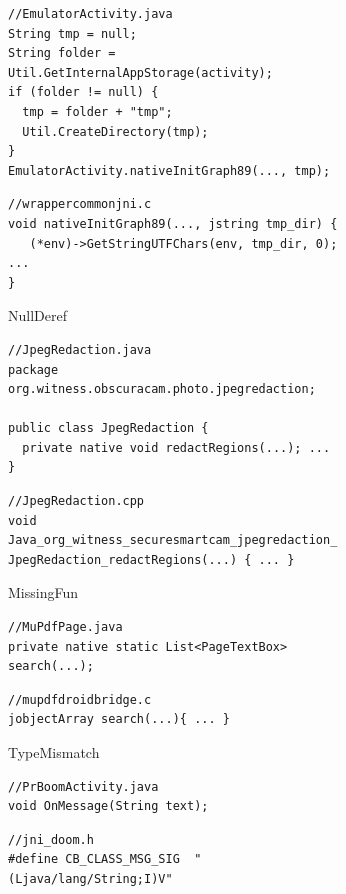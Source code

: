 \begin{figure}[ht!]
  \centering
  \begin{subfigure}{0.8\textwidth}
    \begin{lstlisting}[style=java,xleftmargin=2.5em]
//EmulatorActivity.java
String tmp = null;
String folder = Util.GetInternalAppStorage(activity);
if (folder != null) {
  tmp = folder + "tmp";
  Util.CreateDirectory(tmp);
}
EmulatorActivity.nativeInitGraph89(..., tmp);
    \end{lstlisting}
    \begin{lstlisting}[style=cpp,xleftmargin=2.5em]
//wrappercommonjni.c
void nativeInitGraph89(..., jstring tmp_dir) {
   (*env)->GetStringUTFChars(env, tmp_dir, 0); ...
}
    \end{lstlisting}
    \caption{\normalsize NullDeref}
    \label{fig:bug1}
  \end{subfigure}
  \begin{subfigure}{0.8\textwidth}
    \begin{lstlisting}[style=java,xleftmargin=2.5em]
//JpegRedaction.java
package org.witness.obscuracam.photo.jpegredaction;

public class JpegRedaction {
  private native void redactRegions(...); ...
}
    \end{lstlisting}
    \begin{lstlisting}[style=cpp,xleftmargin=2.5em]
//JpegRedaction.cpp
void Java_org_witness_securesmartcam_jpegredaction_ JpegRedaction_redactRegions(...) { ... }
    \end{lstlisting}
    \caption{\normalsize MissingFun}
    \label{fig:bug2}
  \end{subfigure}
  \begin{subfigure}{0.8\textwidth}
    \begin{lstlisting}[style=java,xleftmargin=2.5em]
//MuPdfPage.java
private native static List<PageTextBox> search(...);
    \end{lstlisting}
    \begin{lstlisting}[style=cpp,xleftmargin=2.5em]
//mupdfdroidbridge.c
jobjectArray search(...){ ... }
    \end{lstlisting}
    \caption{\normalsize TypeMismatch}
    \label{fig:bug3}
  \end{subfigure}
  \begin{subfigure}{0.8\textwidth}
    \begin{lstlisting}[style=java,xleftmargin=2.5em]
//PrBoomActivity.java
void OnMessage(String text);
    \end{lstlisting}
    \begin{lstlisting}[style=cpp,xleftmargin=2.5em]
//jni_doom.h
#define CB_CLASS_MSG_SIG  "(Ljava/lang/String;I)V"


\end{lstlisting}
\end{subfigure}
\end{figure}
